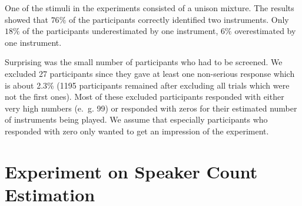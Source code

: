 \par
One of the stimuli in the experiments consisted of a unison mixture. The results showed that $76\%$ of the participants correctly identified two instruments. Only $18\%$ of the participants underestimated by one instrument, $6\%$ overestimated by one instrument.
\par
Surprising was the small number of participants who had to be screened. We excluded 27 participants since they gave at least one non-serious response which is about 2.3\% (1195 participants remained after excluding all trials which were not the first ones). Most of these excluded participants responded with either very high numbers (e.~g. 99) or responded with zeros for their estimated number of instruments being played. We assume that especially participants who responded with zero only wanted to get an impression of the experiment.

\section{Experiment on Speaker Count Estimation}%
\label{sec:count_experiment}


